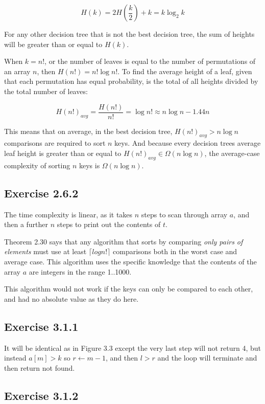 \documentclass{article}
\begin{document}
\[H(k) = 2H\left(\frac{k}{2}\right) + k = k\log_2{k}\]

For any other decision tree that is not the best decision tree, the sum of heights will be greater than or equal to \(H(k)\).

When \(k=n!\), or the number of leaves is equal to the number of permutations of an array \(n\), then \(H(n!)=n!\log{n!}\). To find the average height of a leaf, given that each permutation has equal probability, is the total of all heights divided by the total number of leaves:

\[H(n!)_{avg} = \frac{H(n!)}{n!} = \log{n!} \approx n\log{n} - 1.44n\]

This means that on average, in the best decision tree, \(H(n!)_{avg} > n\log{n} \) comparisons are required to sort \(n\) keys.
And because every decision trees average leaf height is greater than or equal to  \(H(n!)_{avg} \in \Omega(n\log{n})\), the average-case complexity of sorting \(n\) keys is \(\Omega(n\log{n})\).


\subsection*{Exercise 2.6.2}

The time complexity is linear, as it takes \(n\) steps to scan through array \(a\), and then a further \(n\) steps to print out the contents of \(t\).

Theorem 2.30 says that any algorithm that sorts by comparing \textit{only pairs of elements} must use at least \(\lceil log{n!}\rceil\) comparisons both in the worst case and average case. This algorithm uses the specific knowledge that the contents of the array \(a\) are integers in the range 1..1000. 

This algorithm would not work if the keys can only be compared to each other, and had no absolute value as they do here.



\subsection*{Exercise 3.1.1}

It will be identical as in Figure 3.3 except the very last step will not return 4, but instead \(a[m] > k\) so \(r \leftarrow m-1\), and then \(l > r\) and the loop will terminate and then return not found.


\subsection*{Exercise 3.1.2}
\end{document}
